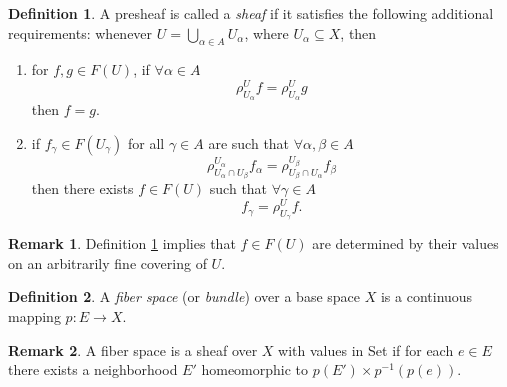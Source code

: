 \documentclass{article}
\theoremstyle{definition}
\newtheorem{definition}{Definition}
\newtheorem*{remark}{Remark}
\begin{document}
\begin{definition}
    \label{def:sheaf}
    A presheaf is called a \emph{sheaf} if it satisfies the following additional requirements: whenever $U = \bigcup_{\alpha \in A} U_\alpha$, where $U_\alpha \subseteq X$, then
    
    \begin{enumerate}
        \item for $f, g \in F(U)$, if $\forall \alpha \in A$
        \begin{equation*}
            \rho_{U_\alpha}^U f = \rho_{U_\alpha}^U g
        \end{equation*}
        then $f = g$.
        \item if $f_\gamma \in F(U_\gamma)$ for all $\gamma \in A$ are such that $\forall \alpha, \beta \in A$
        \begin{equation*}
            \rho_{U_\alpha \cap U_\beta}^{U_\alpha} f_\alpha
            = \rho_{U_\beta \cap U_\alpha}^{U_\beta} f_\beta
        \end{equation*}
        then there exists $f \in F(U)$ such that $\forall \gamma \in A$
        \begin{equation*}
            f_\gamma = \rho_{U_\gamma}^U f.
        \end{equation*}
    \end{enumerate}
\end{definition}

\begin{remark}
    Definition \ref{def:sheaf} implies that $f \in F(U)$ are determined by their values on an arbitrarily fine covering of $U$.
\end{remark}

\begin{definition}
    A \emph{fiber space} (or \emph{bundle}) over a base space $X$ is a continuous mapping $p: E \rightarrow X$.
\end{definition}

\begin{remark}
    A fiber space is a sheaf over $X$ with values in Set if for each $e \in E$ there exists a neighborhood $E'$ homeomorphic to $p(E') \times p^{-1}(p(e))$.
\end{remark}



\end{document}

